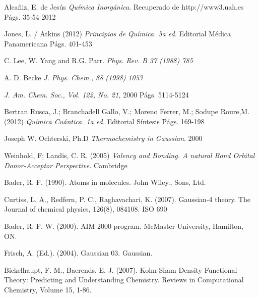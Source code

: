 \begin{thebibliography}{9}

Alcañiz, E. de Jesús
\textit{Química Inorgánica}. 
Recuperado de http://www3.uah.es Págs. 35-54
2012

Jones, L. / Atkins (2012)
\textit{Principios de Química. 5a ed.} Editorial Médica Panamericana
Págs. 401-453

C. Lee, W. Yang and R.G. Parr.
\textit{ Phys. Rev. B 37 (1988) 785}

A. D. Becke
\textit{J. Phys. Chem., 88 (1998) 1053}

\textit{J. Am. Chem. Soc., Vol. 122, No. 21, }
2000 Págs. 5114-5124

Bertran Rusca, J.; Branchadell Gallo, V.; Moreno Ferrer, M.; Sodupe Roure,M. (2012)
\textit{Química Cuántica. 1a ed.} Editorial Síntesis
Págs. 169-198

Joseph W. Ochterski, Ph.D
\textit{Thermochemistry in Gaussian}.
2000

Weinhold, F; Landis, C. R. (2005) 
\textit{Valency and Bonding. A natural Bond Orbital Donor-Acceptor Perspective.}
Cambridge

Bader, R. F. (1990). Atoms in molecules. John Wiley., Sons, Ltd.

Curtiss, L. A., Redfern, P. C., Raghavachari, K. (2007). Gaussian-4 theory. The Journal of chemical physics, 126(8), 084108.
ISO 690	


Bader, R. F. W. (2000). AIM 2000 program. McMaster University, Hamilton, ON.

Frisch, A. (Ed.). (2004). Gaussian 03. Gaussian.

Bickelhaupt, F. M., Baerends, E. J. (2007). Kohn‐Sham Density Functional Theory: Predicting and Understanding Chemistry. Reviews in Computational Chemistry, Volume 15, 1-86.
\end{thebibliography}
